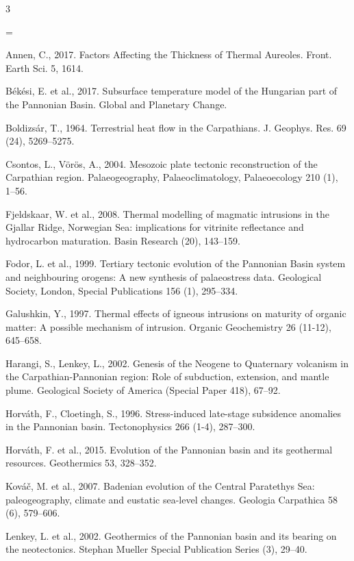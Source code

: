 \documentclass[11.5pt,twoside]{report}
\newenvironment{localsize}[1] %
{%
	\clearpage
	\let\orignewcommand\newcommand
	\let\newcommand\renewcommand
	\makeatletter
	\makeatother
	\let\newcommand\orignewcommand
}
{%
	\clearpage
}
\begin{document}
\begin{multicols}{3} %
	
\begin{localsize}{10}
	
\parindent=0pt
\parskip=\smallskipamount

Annen, C., 2017. Factors Affecting the Thickness of Thermal Aureoles. Front. Earth Sci. 5, 1614.

Békési, E. et al., 2017. Subsurface temperature model of the Hungarian part of the Pannonian Basin. Global and Planetary Change.

Boldizsár, T., 1964. Terrestrial heat flow in the Carpathians. J. Geophys. Res. 69 (24), 5269–5275.

Csontos, L., Vörös, A., 2004. Mesozoic plate tectonic reconstruction of the Carpathian region. Palaeogeography, Palaeoclimatology, Palaeoecology 210 (1), 1–56.

Fjeldskaar, W. et al., 2008. Thermal modelling of magmatic intrusions in the Gjallar Ridge, Norwegian Sea: implications for vitrinite reflectance and hydrocarbon maturation. Basin Research (20), 143–159. 

Fodor, L. et al., 1999. Tertiary tectonic evolution of the Pannonian Basin system and neighbouring orogens: A new synthesis of palaeostress data. Geological Society, London, Special Publications 156 (1), 295–334. 

Galushkin, Y., 1997. Thermal effects of igneous intrusions on maturity of organic matter: A possible mechanism of intrusion. Organic Geochemistry 26 (11-12), 645–658. 

Harangi, S., Lenkey, L., 2002. Genesis of the Neogene to Quaternary volcanism in the Carpathian-Pannonian region: Role of subduction, extension, and mantle plume. Geological Society of America (Special Paper 418), 67–92.

Horváth, F., Cloetingh, S., 1996. Stress-induced late-stage subsidence anomalies in the Pannonian basin. Tectonophysics 266 (1-4), 287–300. 

Horváth, F. et al., 2015. Evolution of the Pannonian basin and its geothermal resources. Geothermics 53, 328–352. 

Kováč, M. et al., 2007. Badenian evolution of the Central Paratethys Sea: paleogeography, climate and eustatic sea-level changes. Geologia Carpathica 58 (6), 579–606.

Lenkey, L. et al., 2002. Geothermics of the Pannonian basin and its bearing on the neotectonics. Stephan Mueller Special Publication Series (3), 29–40.


\end{localsize}
\end{multicols}
\end{document}
